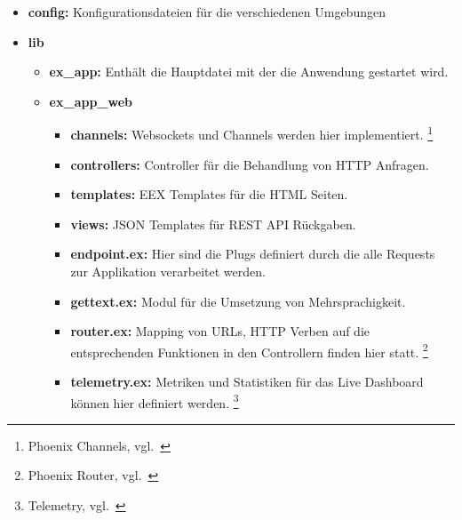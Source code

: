 \begin{itemize}
    \item \textbf{config:} Konfigurationsdateien für die verschiedenen Umgebungen
    \item \textbf{lib}
    \begin{itemize}
        \item \textbf{ex\_app:} Enthält die Hauptdatei mit der die Anwendung gestartet wird.
        \item \textbf{ex\_app\_web}
        \begin{itemize}
            \item \textbf{channels:}
            Websockets und Channels werden hier implementiert.
            \footnote{{Phoenix Channels, vgl.~\cite{PHOENIX_CHANNELS}}}

            \item \textbf{controllers:}
            Controller für die Behandlung von HTTP Anfragen.

            \item \textbf{templates:}
            EEX Templates für die HTML Seiten.

            \item \textbf{views:}
            JSON Templates für REST API Rückgaben.

            \item \textbf{endpoint.ex:}
            Hier sind die Plugs definiert durch die alle Requests zur Applikation verarbeitet werden.

            \item \textbf{gettext.ex:}
            Modul für die Umsetzung von Mehrsprachigkeit.

            \item \textbf{router.ex:}
            Mapping von URLs, HTTP Verben auf die entsprechenden Funktionen in den Controllern finden hier statt.
            \footnote{{Phoenix Router, vgl.~\cite{PHOENIX_ROUTER}}}

            \item \textbf{telemetry.ex:}
            Metriken und Statistiken für das Live Dashboard können hier definiert werden.
            \footnote{{Telemetry, vgl.~\cite{PHOENIX_TELEMETRY}}}


\end{itemize}
\end{itemize}
\end{itemize}
